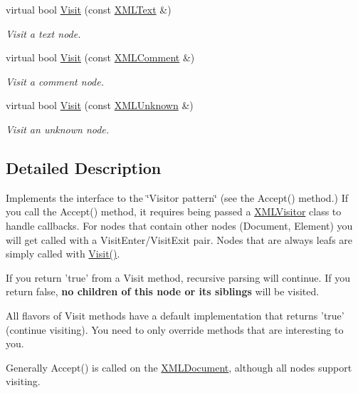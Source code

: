 \begin{DoxyCompactItemize}
virtual bool \hyperlink{classtinyxml2_1_1_x_m_l_visitor_af30233565856480ea48b6fa0d6dec65b}{Visit} (const \hyperlink{classtinyxml2_1_1_x_m_l_text}{X\+M\+L\+Text} \&)
\begin{DoxyCompactList}\small\item\em Visit a text node. \end{DoxyCompactList}\item 
virtual bool \hyperlink{classtinyxml2_1_1_x_m_l_visitor_acc8147fb5a85f6c65721654e427752d7}{Visit} (const \hyperlink{classtinyxml2_1_1_x_m_l_comment}{X\+M\+L\+Comment} \&)
\begin{DoxyCompactList}\small\item\em Visit a comment node. \end{DoxyCompactList}\item 
virtual bool \hyperlink{classtinyxml2_1_1_x_m_l_visitor_a14e4748387c34bf53d24e8119bb1f292}{Visit} (const \hyperlink{classtinyxml2_1_1_x_m_l_unknown}{X\+M\+L\+Unknown} \&)
\begin{DoxyCompactList}\small\item\em Visit an unknown node. \end{DoxyCompactList}\end{DoxyCompactItemize}


\subsection{Detailed Description}
Implements the interface to the \char`\"{}\+Visitor pattern\char`\"{} (see the Accept() method.) If you call the Accept() method, it requires being passed a \hyperlink{classtinyxml2_1_1_x_m_l_visitor}{X\+M\+L\+Visitor} class to handle callbacks. For nodes that contain other nodes (Document, Element) you will get called with a Visit\+Enter/\+Visit\+Exit pair. Nodes that are always leafs are simply called with \hyperlink{classtinyxml2_1_1_x_m_l_visitor_adc75bd459fc7ba8223b50f0616767f9a}{Visit()}.

If you return 'true' from a Visit method, recursive parsing will continue. If you return false, {\bfseries no children of this node or its siblings} will be visited.

All flavors of Visit methods have a default implementation that returns 'true' (continue visiting). You need to only override methods that are interesting to you.

Generally Accept() is called on the \hyperlink{classtinyxml2_1_1_x_m_l_document}{X\+M\+L\+Document}, although all nodes support visiting.

